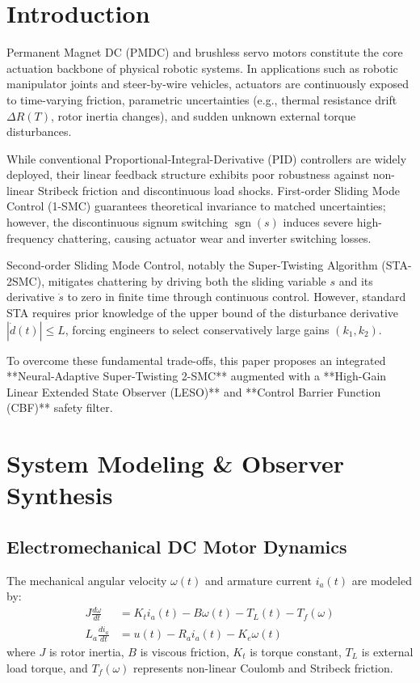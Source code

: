 \documentclass[journal,twocolumn,letterpaper]{IEEEtran}
\begin{document}
\section{Introduction}
Permanent Magnet DC (PMDC) and brushless servo motors constitute the core actuation backbone of physical robotic systems. In applications such as robotic manipulator joints and steer-by-wire vehicles, actuators are continuously exposed to time-varying friction, parametric uncertainties (e.g., thermal resistance drift $\Delta R(T)$, rotor inertia changes), and sudden unknown external torque disturbances.

While conventional Proportional-Integral-Derivative (PID) controllers are widely deployed, their linear feedback structure exhibits poor robustness against non-linear Stribeck friction and discontinuous load shocks. First-order Sliding Mode Control (1-SMC) guarantees theoretical invariance to matched uncertainties; however, the discontinuous signum switching $\operatorname{sgn}(s)$ induces severe high-frequency chattering, causing actuator wear and inverter switching losses.

Second-order Sliding Mode Control, notably the Super-Twisting Algorithm (STA-2SMC), mitigates chattering by driving both the sliding variable $s$ and its derivative $\dot{s}$ to zero in finite time through continuous control. However, standard STA requires prior knowledge of the upper bound of the disturbance derivative $|\dot{d}(t)| \le L$, forcing engineers to select conservatively large gains $(k_1, k_2)$.

To overcome these fundamental trade-offs, this paper proposes an integrated **Neural-Adaptive Super-Twisting 2-SMC** augmented with a **High-Gain Linear Extended State Observer (LESO)** and **Control Barrier Function (CBF)** safety filter.

\section{System Modeling \& Observer Synthesis}

\subsection{Electromechanical DC Motor Dynamics}
The mechanical angular velocity $\omega(t)$ and armature current $i_a(t)$ are modeled by:
\begin{align}
J \frac{d\omega}{dt} &= K_t i_a(t) - B \omega(t) - T_L(t) - T_f(\omega) \label{eq:mech} \\
L_a \frac{di_a}{dt} &= u(t) - R_a i_a(t) - K_e \omega(t) \label{eq:elec}
\end{align}
where $J$ is rotor inertia, $B$ is viscous friction, $K_t$ is torque constant, $T_L$ is external load torque, and $T_f(\omega)$ represents non-linear Coulomb and Stribeck friction.
\end{document}
